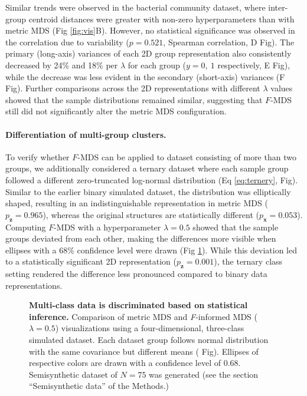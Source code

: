 \documentclass[10pt,letterpaper]{article}
\newcommand{\1}{{\rm 1}\kern-0.24em{\rm I}}
\begin{document}
Similar trends were observed in the bacterial community dataset, where inter-group centroid distances were greater with non-zero hyperparameters than with metric MDS (Fig \ref{fig:vis}B). However, no statistical significance was observed in the correlation due to variability ($p = 0.521$, Spearman correlation, D Fig). The primary (long-axis) variances of each 2D group representation also consistently decreased by 24\% and 18\% per $\lambda$ for each group ($y=0,\ 1$ respectively, E Fig), while the decrease was less evident in the secondary (short-axis) variances (F Fig). Further comparisons across the 2D representations with different $\lambda$ values showed that the sample distributions remained similar, suggesting that $F$-MDS still did not significantly alter the metric MDS configuration.


\paragraph*{Differentiation of multi-group clusters.} To verify whether $F$-MDS can be applied to dataset consisting of more than two groups, we additionally considered a ternary dataset where each sample group followed a different zero-truncated log-normal distribution (Eq \ref{eq:ternery},  Fig). Similar to the earlier binary simulated dataset, the distribution was elliptically shaped, resulting in an indistinguishable representation in metric MDS ($p_\mathbf{z}=0.965$), whereas the original structures are statistically different ($p_\mathbf{x}=0.053$). Computing $F$-MDS with a hyperparameter $\lambda=0.5$ showed that the sample groups deviated from each other, making the differences more visible when ellipses with a 68\% confidence level were drawn (Fig \ref{fig:vis_multiclass}). While this deviation led to a statistically significant 2D representation ($p_\mathbf{z}=0.001$), the ternary class setting rendered the difference less pronounced compared to binary data representations.


\begin{figure}[h!]
    \centering
    \caption{\textbf{Multi-class data is discriminated based on statistical inference.} Comparison of metric MDS and \textit{F}-informed MDS ($\lambda=0.5$) visualizations using a four-dimensional, three-class simulated dataset. Each dataset group follows normal distribution with the same covariance but different means ( Fig). Ellipses of respective colors are drawn with a confidence level of 0.68. Semisynthetic dataset of $N=75$ was generated (see the section ``Semisynthetic data'' of the Methods.)}
    \label{fig:vis_multiclass}
\end{figure}
\end{document}
